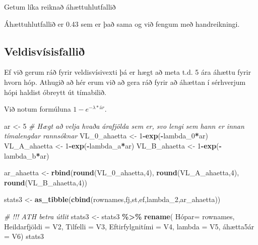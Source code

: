 \documentclass[
]{book}
\newenvironment{Shaded}{\begin{snugshade}}{\end{snugshade}}
\newcommand{\CommentTok}[1]{\textcolor[rgb]{0.56,0.35,0.01}{\textit{#1}}}
\newcommand{\DataTypeTok}[1]{\textcolor[rgb]{0.13,0.29,0.53}{#1}}
\newcommand{\DecValTok}[1]{\textcolor[rgb]{0.00,0.00,0.81}{#1}}
\newcommand{\KeywordTok}[1]{\textcolor[rgb]{0.13,0.29,0.53}{\textbf{#1}}}
\newcommand{\NormalTok}[1]{#1}
\newcommand{\OperatorTok}[1]{\textcolor[rgb]{0.81,0.36,0.00}{\textbf{#1}}}
\newcommand{\StringTok}[1]{\textcolor[rgb]{0.31,0.60,0.02}{#1}}
\begin{document}
Getum líka reiknað áhættuhlutfallið

\begin{Shaded}
\end{Shaded}

Áhættuhlutfallið er 0.43 sem er það sama og við fengum með handreikningi.

\hypertarget{veldisvuxedsisfalliuxf0}{%
\subsection{Veldisvísisfallið}\label{veldisvuxedsisfalliuxf0}}

Ef við gerum ráð fyrir veldisvísivexti þá er hægt að meta t.d. 5 ára áhættu fyrir hvorn hóp. Athugið að hér erum við að gera ráð fyrir að áhættan í sérhverjum hópi haldist óbreytt út tímabilið.

Við notum formúluna \(1-e^{-\lambda*ár}\).

\begin{Shaded}
\begin{Highlighting}[]
\NormalTok{ar <{-}}\StringTok{ }\DecValTok{5} \CommentTok{\# Hægt að velja hvaða árafjölda sem er, svo lengi sem hann er innan tímalengdar rannsóknar}
\NormalTok{VL\_}\DecValTok{0}\NormalTok{\_ahaetta <{-}}\StringTok{ }\DecValTok{1}\OperatorTok{{-}}\KeywordTok{exp}\NormalTok{(}\OperatorTok{{-}}\NormalTok{lambda\_}\DecValTok{0}\OperatorTok{*}\NormalTok{ar)}
\NormalTok{VL\_A\_ahaetta <{-}}\StringTok{ }\DecValTok{1}\OperatorTok{{-}}\KeywordTok{exp}\NormalTok{(}\OperatorTok{{-}}\NormalTok{lambda\_a}\OperatorTok{*}\NormalTok{ar)}
\NormalTok{VL\_B\_ahaetta <{-}}\StringTok{ }\DecValTok{1}\OperatorTok{{-}}\KeywordTok{exp}\NormalTok{(}\OperatorTok{{-}}\NormalTok{lambda\_b}\OperatorTok{*}\NormalTok{ar)}

\NormalTok{ar\_ahaetta <{-}}\StringTok{ }\KeywordTok{rbind}\NormalTok{(}\KeywordTok{round}\NormalTok{(VL\_}\DecValTok{0}\NormalTok{\_ahaetta,}\DecValTok{4}\NormalTok{), }\KeywordTok{round}\NormalTok{(VL\_A\_ahaetta,}\DecValTok{4}\NormalTok{), }\KeywordTok{round}\NormalTok{(VL\_B\_ahaetta,}\DecValTok{4}\NormalTok{))}

\NormalTok{stats3 <{-}}\StringTok{ }\KeywordTok{as\_tibble}\NormalTok{(}\KeywordTok{cbind}\NormalTok{(rownames,fj,st,ef,lambda\_}\DecValTok{2}\NormalTok{,ar\_ahaetta))}

\CommentTok{\# !!! ATH betra útlit}
\NormalTok{stats3 <{-}}\StringTok{ }\NormalTok{stats3 }\OperatorTok{\%>\%}\StringTok{ }\KeywordTok{rename}\NormalTok{( Hópar=}\StringTok{ }\NormalTok{rownames, Heildarfjöldi =}\StringTok{ }\NormalTok{V2,  }\DataTypeTok{Tilfelli =}\NormalTok{ V3, Eftirfylgnitími =}\StringTok{ }\NormalTok{V4, }\DataTypeTok{lambda =}\NormalTok{ V5, áhætta5ár =}\StringTok{ }\NormalTok{V6)}
\NormalTok{stats3}
\end{Highlighting}
\end{Shaded}
\end{document}
